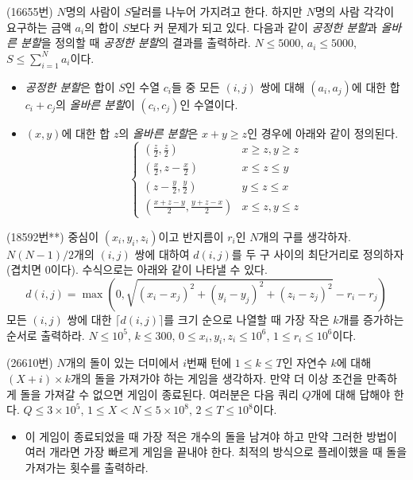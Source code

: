 \begin{problem}
    (16655번) $N$명의 사람이 $S$달러를 나누어 가지려고 한다. 하지만 $N$명의 사람 각각이 요구하는 금액 $a_i$의 합이 $S$보다 커 문제가 되고 있다. 다음과 같이 \textit{공정한 분할}과 \textit{올바른 분할}을 정의할 때 \textit{공정한 분할}의 결과를 출력하라. $N \leq 5000$, $a_i \leq 5000$, $S \leq \sum_{i=1}^N {a_i}$이다.
    \begin{itemize}
        \item \textit{공정한 분할}은 합이 $S$인 수열 $c_i$들 중 모든 $(i, j)$ 쌍에 대해 $(a_i, a_j)$에 대한 합 $c_i + c_j$의 \textit{올바른 분할}이 $(c_i, c_j)$인 수열이다.
        \item $(x, y)$에 대한 합 $z$의 \textit{올바른 분할}은 $x+y \geq z$인 경우에 아래와 같이 정의된다.
        $$\begin{cases} 
            (\frac{z}{2}, \frac{z}{2}) & x \geq z, y \geq z \\
            (\frac{x}{2}, z - \frac{x}{2}) & x \leq z \leq y \\
            (z - \frac{y}{2}, \frac{y}{2}) & y \leq z \leq x \\
            (\frac{x+z-y}{2}, \frac{y+z-x}{2}) & x \leq z, y \leq z
        \end{cases}$$
    \end{itemize}
\end{problem}

\begin{problem}
    (18592번**) 중심이 $(x_i, y_i, z_i)$이고 반지름이 $r_i$인 $N$개의 구를 생각하자. $N(N-1)/2$개의 $(i, j)$ 쌍에 대하여 $d(i, j)$를 두 구 사이의 최단거리로 정의하자(겹치면 $0$이다). 수식으로는 아래와 같이 나타낼 수 있다.
    $$d(i, j) = \max \left( 0, \sqrt{(x_i - x_j)^2 + (y_i - y_j)^2 + (z_i - z_j)^2} - r_i - r_j \right)$$
    모든 $(i, j)$ 쌍에 대한 $\lceil d(i, j) \rceil$를 크기 순으로 나열할 때 가장 작은 $k$개를 증가하는 순서로 출력하라. $N \leq 10^5$, $k \leq 300$, $0 \leq x_i, y_i, z_i\leq 10^6$, $1 \leq r_i \leq 10^6$이다.
\end{problem}

\begin{problem}
    (26610번) $N$개의 돌이 있는 더미에서 $i$번째 턴에 $1 \leq k \leq T$인 자연수 $k$에 대해 $(X+i) \times k$개의 돌을 가져가야 하는 게임을 생각하자. 만약 더 이상 조건을 만족하게 돌을 가져갈 수 없으면 게임이 종료된다. 여러분은 다음 쿼리 $Q$개에 대해 답해야 한다. $Q \leq 3 \times 10^5$, $1 \leq X < N \leq 5 \times 10^8$, $2 \leq T \leq 10^8$이다.
    \begin{itemize}
        \item 이 게임이 종료되었을 때 가장 적은 개수의 돌을 남겨야 하고 만약 그러한 방법이 여러 개라면 가장 빠르게 게임을 끝내야 한다. 최적의 방식으로 플레이했을 때 돌을 가져가는 횟수를 출력하라.
    \end{itemize}
\end{problem}